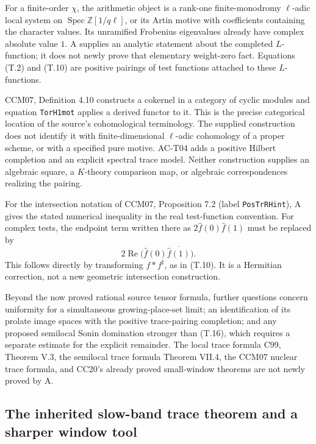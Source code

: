For a finite-order \(\chi\), the arithmetic
object is a rank-one finite-monodromy
\(\ell\)-adic local system on
\(\operatorname{Spec}\mathbb Z[1/q\ell]\),
or its Artin motive with coefficients
containing the character values. Its
unramified Frobenius eigenvalues already
have complex absolute value \(1\).
A supplies an analytic statement about the
completed \(L\)-function; it does not newly
prove that elementary weight-zero fact.
Equations (T.2) and (T.10) are positive
pairings of test functions attached to
these \(L\)-functions.

CCM07, Definition 4.10 constructs a cokernel
in a category of cyclic modules and
equation \texttt{TorH1mot} applies a derived
functor to it. This is the precise
categorical location of the source's
cohomological terminology. The supplied
construction does not identify it with
finite-dimensional \(\ell\)-adic
cohomology of a proper scheme, or with
a specified pure motive. AC-T04 adds
a positive Hilbert completion and an
explicit spectral trace model. Neither
construction supplies an algebraic
square, a \(K\)-theory comparison map,
or algebraic correspondences realizing
the pairing.

For the intersection notation of CCM07,
Proposition 7.2 (label \texttt{PosTrRHint}),
A gives the stated numerical inequality
in the real test-function convention.
For complex tests, the endpoint term
written there as \(2\widehat f(0)
\widehat f(1)\) must be replaced by
\[
 2\operatorname{Re}
      \bigl(\widehat f(0)\overline{\widehat f(1)}\bigr).
\]
This follows directly by transforming
\(f*f^\sharp\), as in (T.10).
It is a Hermitian correction, not a
new geometric intersection construction.

Beyond the now proved rational source tensor
formula, further questions concern uniformity
for a simultaneous growing-place-set limit;
an identification of its prolate image
spaces with the positive trace-pairing
completion; and any proposed semilocal
Sonin domination stronger than (T.16),
which requires a separate estimate for
the explicit remainder. The local
trace formula C99, Theorem V.3, the
semilocal trace formula Theorem VII.4,
the CCM07 nuclear trace formula, and
CC20's already proved small-window
theorems are not newly proved by A.

\subsection{The inherited slow-band trace theorem and a sharper window tool}

